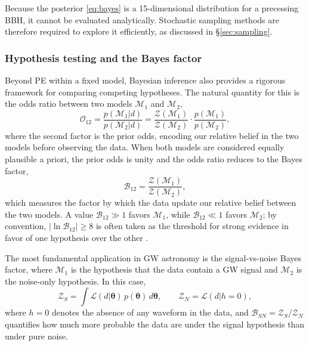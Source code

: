 Because the posterior \eqref{eq:bayes} is a 15-dimensional 
distribution for a precessing BBH, it cannot be evaluated analytically. Stochastic sampling methods are therefore required to explore it efficiently, as discussed in 
\S\ref{sec:sampling}.

\subsubsection{Hypothesis testing and the Bayes factor}
\label{sec:bayes_factor}


Beyond PE within a fixed model, Bayesian inference also provides a rigorous framework for comparing competing hypotheses. The natural quantity for this is the odds ratio between two models $\mathcal{M}_1$ and $\mathcal{M}_2$,
\begin{equation}
    \mathcal{O}_{12} = 
    \frac{p(\mathcal{M}_1|d)}{p(\mathcal{M}_2|d)} =
    \frac{\mathcal{Z}(\mathcal{M}_1)}{\mathcal{Z}(\mathcal{M}_2)}
    \cdot
    \frac{p(\mathcal{M}_1)}{p(\mathcal{M}_2)},
    \label{eq:odds}
\end{equation}
where the second factor is the prior odds, encoding our relative belief in the two models before observing the data. When both models are considered equally plausible a priori, the prior odds is unity and the odds ratio reduces to the Bayes factor,
\begin{equation}
    \mathcal{B}_{12} = 
    \frac{\mathcal{Z}(\mathcal{M}_1)}{\mathcal{Z}(\mathcal{M}_2)},
    \label{eq:bayes_factor}
\end{equation}
which measures the factor by which the data update our relative belief between the two models. A value $\mathcal{B}_{12} \gg 1$ favors $\mathcal{M}_1$, while $\mathcal{B}_{12} \ll 1$ favors $\mathcal{M}_2$; by convention, $|\ln\mathcal{B}_{12}| \geq 8$ is often taken as the threshold for strong evidence in favor of one hypothesis over the other \cite{Jeffreys, bayesfactor_8}.

The most fundamental application in GW astronomy is the 
signal-vs-noise Bayes factor, where $\mathcal{M}_1$ is the 
hypothesis that the data contain a GW signal and $\mathcal{M}_2$ is the noise-only hypothesis. In this case,
\begin{equation}
    \mathcal{Z}_S = \int 
    \mathcal{L}(d|\boldsymbol{\theta})\,
    p(\boldsymbol{\theta})\,d\boldsymbol{\theta}, 
    \qquad
    \mathcal{Z}_N = \mathcal{L}(d|h=0),
\end{equation}
where $h=0$ denotes the absence of any waveform in the data, and $\mathcal{B}_{SN} = \mathcal{Z}_S/\mathcal{Z}_N$ quantifies how much more probable the data are under the signal hypothesis than under pure noise.

